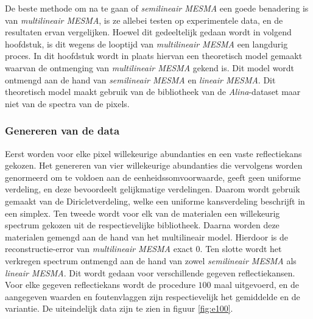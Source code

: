 \documentclass[12pt]{report}
\begin{document}
De beste methode om na te gaan of \textit{semilineair MESMA} een goede benadering is van \textit{multilineair MESMA}, is ze allebei testen op experimentele data, en de resultaten ervan vergelijken. Hoewel dit gedeeltelijk gedaan wordt in volgend hoofdstuk, is dit wegens de looptijd van \textit{multilineair MESMA} een langdurig proces. In dit hoofdstuk wordt in plaats hiervan een theoretisch model gemaakt waarvan de ontmenging van \textit{multilineair MESMA} gekend is. Dit model wordt ontmengd aan de hand van \textit{semilineair MESMA} en \textit{lineair MESMA}. Dit theoretisch model maakt gebruik van de bibliotheek van de \textit{Alina}-dataset maar niet van de spectra van de pixels.

\subsubsection{Genereren van de data}

Eerst worden voor elke pixel willekeurige abundanties en een vaste reflectiekans gekozen. Het genereren van vier willekeurige abundanties die vervolgens worden genormeerd om te voldoen aan de eenheidssomvoorwaarde, geeft geen uniforme verdeling, en deze bevoordeelt gelijkmatige verdelingen. Daarom wordt gebruik gemaakt van de Diricletverdeling, welke een uniforme kansverdeling beschrijft in een simplex. Ten tweede wordt voor elk van de materialen een willekeurig spectrum gekozen uit de respectievelijke bibliotheek. Daarna worden deze materialen gemengd aan de hand van het multilineair model. Hierdoor is de reconstructie-error van \textit{multilineair MESMA} exact 0. Ten slotte wordt het verkregen spectrum ontmengd aan de hand van zowel \textit{semilineair MESMA} als \textit{lineair MESMA}. Dit wordt gedaan voor verschillende gegeven reflectiekansen. Voor elke gegeven reflectiekans wordt de procedure $100$ maal uitgevoerd, en de aangegeven waarden en foutenvlaggen zijn respectievelijk het gemiddelde en de variantie. De uiteindelijk data zijn te zien in figuur \ref{fig:e100}.
\end{document}
